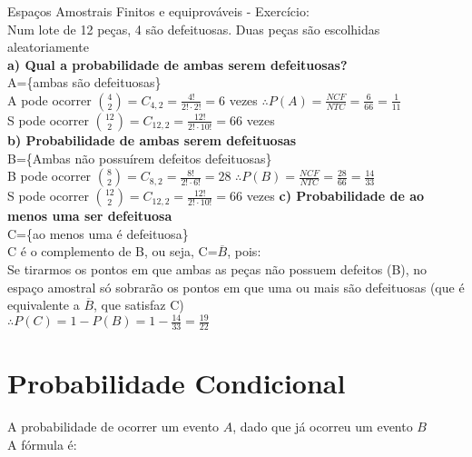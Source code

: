 \documentclass{article}
\begin{document}
{\large Espaços Amostrais Finitos e equiprováveis - Exercício:}\\

\noindent Num lote de 12 peças, 4 são defeituosas. Duas peças são escolhidas aleatoriamente\\
\textbf{a) Qual a probabilidade de ambas serem defeituosas?}\\

\noindent A=\{ambas são defeituosas\}\\
A pode ocorrer $\binom{4}{2}=C_{4,2}=\frac{4!}{2!\cdot2!}=6$ vezes \hspace{1.5cm} $\therefore \boxed{P(A)=\frac{NCF}{NTC}=\frac{6}{66}=\frac{1}{11}}$\\

\noindent S pode ocorrer $\binom{12}{2}=C_{12,2}=\frac{12!}{2!\cdot10!}=66$ vezes\\

\noindent \textbf{b) Probabilidade de ambas serem defeituosas}\\

\noindent B=\{Ambas não possuírem defeitos defeituosas\}\\
\noindent B pode ocorrer $\binom{8}{2}=C_{8,2}=\frac{8!}{2!\cdot6!}=28$\hspace{1.5cm} $\therefore \boxed{P(B)=\frac{NCF}{NTC}=\frac{28}{66}=\frac{14}{33}}$\\

\noindent S pode ocorrer $\binom{12}{2}=C_{12,2}=\frac{12!}{2!\cdot10!}=66$ vezes
\newpage
\noindent \textbf{c) Probabilidade de ao menos uma ser defeituosa}\\

\noindent C=\{ao menos uma é defeituosa\}\\

\noindent C é o complemento de B, ou seja, C=$\overline{B}$, pois:\\
Se tirarmos os pontos em que ambas as peças não possuem defeitos (B), no espaço amostral só sobrarão os pontos em que uma ou mais são defeituosas (que é equivalente a $\overline{B}$, que satisfaz C)\\

\noindent $\displaystyle\therefore P(C)= 1-P(B)=1-\frac{14}{33}=\boxed{\frac{19}{22}}$

\section{Probabilidade Condicional}
A probabilidade de ocorrer um evento $A$, dado que já ocorreu um evento $B$\\
A fórmula é:
\end{document}
